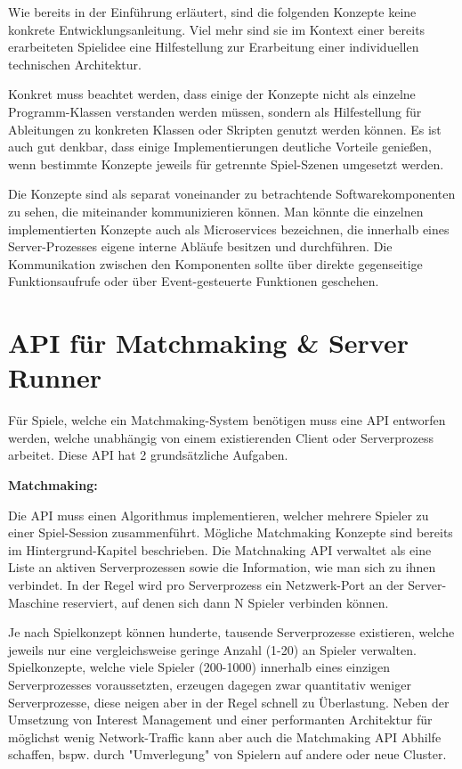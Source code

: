 Wie bereits in der Einführung erläutert, sind die folgenden Konzepte keine konkrete Entwicklungsanleitung. Viel mehr sind sie im Kontext einer bereits erarbeiteten Spielidee eine Hilfestellung zur Erarbeitung einer individuellen technischen Architektur.

Konkret muss beachtet werden, dass einige der Konzepte nicht als einzelne Programm-Klassen verstanden werden müssen, sondern als Hilfestellung für Ableitungen zu konkreten Klassen oder Skripten genutzt werden können. Es ist auch gut denkbar, dass einige Implementierungen deutliche Vorteile genießen, wenn bestimmte Konzepte jeweils für getrennte Spiel-Szenen \cite{Wikipedia.2012} umgesetzt werden.

Die Konzepte sind als separat voneinander zu betrachtende Softwarekomponenten zu sehen, die miteinander kommunizieren können. Man könnte die einzelnen implementierten Konzepte auch als Microservices \cite{Thones.2015} bezeichnen, die innerhalb eines Server-Prozesses eigene interne Abläufe besitzen und durchführen. Die Kommunikation zwischen den Komponenten sollte über direkte gegenseitige Funktionsaufrufe oder über Event-gesteuerte Funktionen \cite{Michelson.2006} geschehen.

\section{API für Matchmaking \& Server Runner}

Für Spiele, welche ein Matchmaking-System benötigen muss eine API entworfen werden, welche unabhängig von einem existierenden Client oder Serverprozess arbeitet. Diese API hat 2 grundsätzliche Aufgaben. 

\textbf{Matchmaking:}

Die API muss einen Algorithmus implementieren, welcher mehrere Spieler zu einer Spiel-Session zusammenführt. Mögliche Matchmaking Konzepte sind bereits im Hintergrund-Kapitel beschrieben. Die Matchnaking API verwaltet als eine Liste an aktiven Serverprozessen sowie die Information, wie man sich zu ihnen verbindet. In der Regel wird pro Serverprozess ein Netzwerk-Port an der Server-Maschine reserviert, auf denen sich dann N Spieler verbinden können.

Je nach Spielkonzept können hunderte, tausende Serverprozesse existieren, welche jeweils nur eine vergleichsweise geringe Anzahl (1-20) an Spieler verwalten. Spielkonzepte, welche viele Spieler (200-1000) innerhalb eines einzigen Serverprozesses voraussetzten, erzeugen dagegen zwar quantitativ weniger Serverprozesse, diese neigen aber in der Regel schnell zu Überlastung. Neben der Umsetzung von Interest Management und einer performanten Architektur für möglichst wenig Network-Traffic kann aber auch die Matchmaking API Abhilfe schaffen, bspw. durch "Umverlegung" von Spielern auf andere oder neue Cluster.

